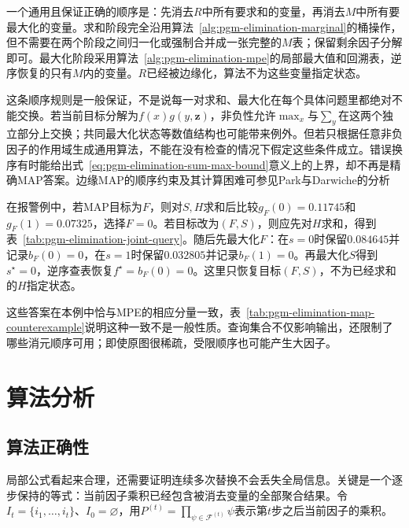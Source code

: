 一个通用且保证正确的顺序是：先消去$R$中所有要求和的变量，再消去$M$中所有要最大化的变量。求和阶段完全沿用算法~\ref{alg:pgm-elimination-marginal}的桶操作，但不需要在两个阶段之间归一化或强制合并成一张完整的$M$表；保留剩余因子分解即可。最大化阶段采用算法~\ref{alg:pgm-elimination-mpe}的局部最大值和回溯表，逆序恢复的只有$M$内的变量。$R$已经被边缘化，算法不为这些变量指定状态。

这条顺序规则是一般保证，不是说每一对求和、最大化在每个具体问题里都绝对不能交换。若当前目标分解为$f(x)g(y,\bm{z})$，非负性允许$\max_x$与$\sum_y$在这两个独立部分上交换；共同最大化状态等数值结构也可能带来例外。但若只根据任意非负因子的作用域生成通用算法，不能在没有检查的情况下假定这些条件成立。错误换序有时能给出式~\eqref{eq:pgm-elimination-sum-max-bound}意义上的上界，却不再是精确MAP答案。边缘MAP的顺序约束及其计算困难可参见Park与Darwiche的分析

在报警例中，若MAP目标为$F$，则对$S,H$求和后比较$g_F(0)=0.11745$和$g_F(1)=0.07325$，选择$F=0$。若目标改为$(F,S)$，则应先对$H$求和，得到表~\ref{tab:pgm-elimination-joint-query}。随后先最大化$F$：在$s=0$时保留$0.084645$并记录$b_F(0)=0$，在$s=1$时保留$0.032805$并记录$b_F(1)=0$。再最大化$S$得到$s^\star=0$，逆序查表恢复$f^\star=b_F(0)=0$。这里只恢复目标$(F,S)$，不为已经求和的$H$指定状态。

这些答案在本例中恰与MPE的相应分量一致，表~\ref{tab:pgm-elimination-map-counterexample}说明这种一致不是一般性质。查询集合不仅影响输出，还限制了哪些消元顺序可用；即使原图很稀疏，受限顺序也可能产生大因子。

\section{算法分析}
\label{sec:pgm-elimination-analysis}

\subsection{算法正确性}
\label{sec:pgm-elimination-correctness}

局部公式看起来合理，还需要证明连续多次替换不会丢失全局信息。关键是一个逐步保持的等式：当前因子乘积已经包含被消去变量的全部聚合结果。令$I_t=\{i_1,\ldots,i_t\}$、$I_0=\varnothing$，用$P^{(t)}=\prod_{\psi\in\mathcal{F}^{(t)}}\psi$表示第$t$步之后当前因子的乘积。

